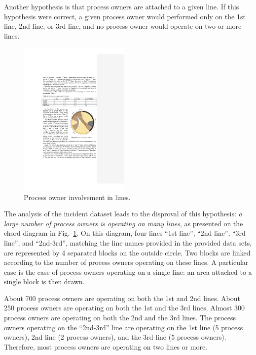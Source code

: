 \documentclass[lnbip]{svmultln}
\begin{document}
Another hypothesis is that process owners are attached to a given line. If this hypothesis were correct, a given process owner would performed only on the 1st line, 2nd line, or 3rd line, and no process owner would operate on two or more lines.

\begin{figure}
  \vspace{-34pt}
  \begin{center}
    \includegraphics[width=0.48\textwidth]{"figs/pic 17"}
  \end{center}
  \vspace{-10pt}
  \caption{Process owner involvement in lines.}
  \label{fig:personsInLines}
  \vspace{-10pt}
\end{figure}
The analysis of the incident dataset leads to the disproval of this hypothesis: \emph{a large number of process owners is operating on many lines}, as presented on the chord diagram in Fig.~\ref{fig:personsInLines}. On this diagram, four lines ``1st line'', ``2nd line'', ``3rd line'', and ``2nd-3rd'', matching the line names provided in the provided data sets, are represented by 4 separated blocks on the outside circle. Two blocks are linked according to the number of process owners operating on these lines. A particular case is the case of process owners operating on a single line: an area attached to a single block is then drawn.

About 700 process owners are operating on both the 1st and 2nd lines. About 250 process owners are operating on both the 1st and the 3rd lines. Almost 300 process owners are operating on both the 2nd and the 3rd lines. The process owners operating on the ``2nd-3rd'' line are operating on the 1st line (5 process owners), 2nd line (2 process owners), and the 3rd line (5 process owners). Therefore, most process owners are operating on two lines or more.
\end{document}
